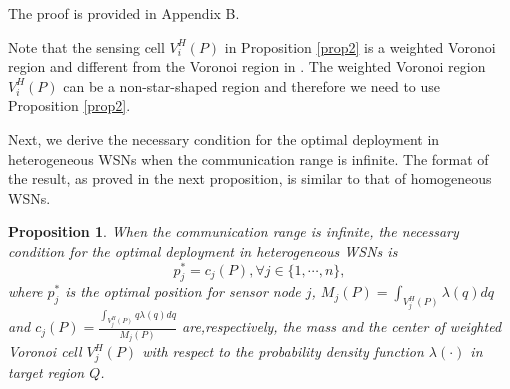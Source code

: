 \documentclass[journal,draftcls,onecolumn,12pt,twoside, narroweqnarray]{IEEEtran}
\newtheorem{prop}{Proposition}
\begin{document}
\begin{IEEEproof}
The proof is provided in Appendix B.
\end{IEEEproof}
Note that the sensing cell $V^H_i(P)$ in Proposition \ref{prop2} is a weighted Voronoi region and different from the Voronoi region in \cite{SD}. The weighted Voronoi region $V^H_i(P)$ can be a non-star-shaped region and therefore we need to use Proposition \ref{prop2}.


Next, we derive the necessary condition for the optimal deployment in heterogeneous WSNs when the communication range is infinite. The format of the result, as proved in the next proposition, is similar to that of homogeneous WSNs.
\begin{prop}
When the communication range is infinite, the necessary condition for the optimal deployment in heterogeneous WSNs is
\begin{equation}
p_j^* = c_j(P), \forall j\in\{1,\cdots,n\},
\label{critical deployment}
\end{equation}
where $p_j^*$ is the optimal position for sensor node $j$, $M_j(P)=\int_{V^H_j(P)}\lambda(q)dq$ and $c_j(P)=\frac{\int_{V^H_j(P)}q\lambda(q)dq}{M_j(P)}$ are,respectively, the mass and the center of weighted Voronoi cell $V^H_j(P)$ with respect to the probability density function $\lambda(\cdot)$ in target region $Q$.
\end{prop}
\end{document}
